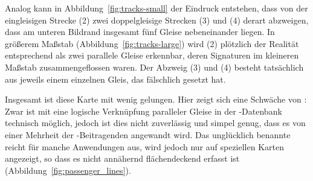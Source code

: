 \documentclass[../main/thesis.tex]{subfiles}
\begin{document}
Analog kann in Abbildung~\ref{fig:tracks-small} der Eindruck entstehen, dass von der eingleisigen Strecke (2) zwei doppelgleisige Strecken (3) und (4) derart abzweigen, dass am unteren Bildrand insgesamt fünf Gleise nebeneinander liegen.
In größerem Maßstab (Abbildung~\ref{fig:tracks-large}) wird (2) plötzlich der Realität entsprechend als zwei parallele Gleise erkennbar, deren Signaturen im kleineren Maßstab zusammengeflossen waren.
Der Abzweig (3) und (4) besteht tatsächlich aus jeweils einem einzelnen Gleis, das fälschlich  gesetzt hat.

Insgesamt ist diese Karte mit  wenig gelungen.
Hier zeigt sich eine Schwäche von \osm: Zwar ist mit  eine logische Verknüpfung paralleler Gleise in der \osm-Datenbank technisch möglich, jedoch ist dies nicht zuverlässig und simpel genug, dass es von einer Mehrheit der \osm-Beitragenden angewandt wird.
Das unglücklich benannte  reicht für manche Anwendungen aus, wird jedoch nur auf speziellen Karten angezeigt,
so dass es nicht annähernd flächendeckend erfasst ist (Abbildung~\ref{fig:passenger_lines}).





\end{document}
